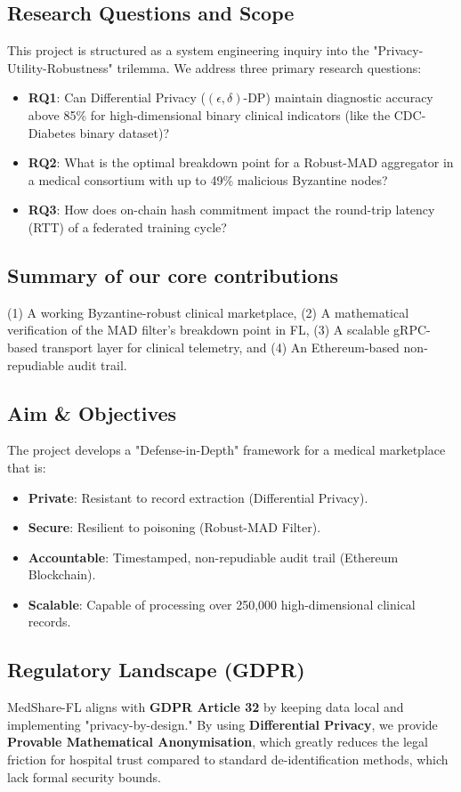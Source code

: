 \documentclass[10pt, a4paper, twocolumn]{article}
\begin{document}
\subsection{Research Questions and Scope}
This project is structured as a system engineering inquiry into the "Privacy-Utility-Robustness" trilemma. We address three primary research questions:
\begin{itemize}
    \item \textbf{RQ1}: Can Differential Privacy ($(\epsilon, \delta)$-DP) maintain diagnostic accuracy above 85\% for high-dimensional binary clinical indicators (like the CDC-Diabetes binary dataset)?
    \item \textbf{RQ2}: What is the optimal breakdown point for a Robust-MAD aggregator in a medical consortium with up to 49\% malicious Byzantine nodes?
    \item \textbf{RQ3}: How does on-chain hash commitment impact the round-trip latency (RTT) of a federated training cycle?
\end{itemize}

\subsection{Summary of our core contributions}
(1) A working Byzantine-robust clinical marketplace, (2) A mathematical verification of the MAD filter's breakdown point in FL, (3) A scalable gRPC-based transport layer for clinical telemetry, and (4) An Ethereum-based non-repudiable audit trail.

\subsection{Aim \& Objectives}
The project develops a "Defense-in-Depth" framework for a medical marketplace that is:
\begin{itemize}
    \item \textbf{Private}: Resistant to record extraction (Differential Privacy).
    \item \textbf{Secure}: Resilient to poisoning (Robust-MAD Filter).
    \item \textbf{Accountable}: Timestamped, non-repudiable audit trail (Ethereum Blockchain).
    \item \textbf{Scalable}: Capable of processing over 250,000 high-dimensional clinical records.
\end{itemize}

\subsection{Regulatory Landscape (GDPR)}
MedShare-FL aligns with \textbf{GDPR Article 32} by keeping data local and implementing "privacy-by-design." By using \textbf{Differential Privacy}, we provide \textbf{Provable Mathematical Anonymisation}, which greatly reduces the legal friction for hospital trust compared to standard de-identification methods, which lack formal security bounds.
\end{document}
